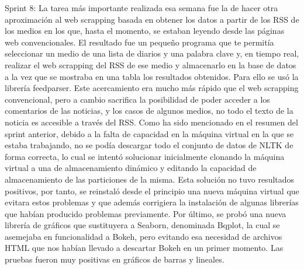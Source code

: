 Sprint 8:
La tarea más importante realizada esa semana fue la de hacer otra aproximación al web scrapping basada en obtener los datos a partir de los RSS de los medios en los que, hasta el momento, se estaban leyendo desde las páginas web convencionales. El resultado fue un pequeño programa que te permitía seleccionar un medio de una lista de diarios y una palabra clave y, en tiempo real, realizar el web scrapping del RSS de ese medio y almacenarlo en la base de datos a la vez que se mostraba en una tabla los resultados obtenidos. Para ello se usó la librería feedparser.
Este acercamiento era mucho más rápido que el web scrapping convencional, pero a cambio sacrifica la posibilidad de poder acceder a los comentarios de las noticias, y los casos de algunos medios, no todo el texto de la noticia es accesible a través del RSS.
Como ha sido mencionado en el resumen del sprint anterior, debido a la falta de capacidad en la máquina virtual en la que se estaba trabajando, no se podía descargar todo el conjunto de datos de NLTK de forma correcta, lo cual se intentó solucionar inicialmente clonando la máquina virtual a una de almacenamiento dinámico y editando la capacidad de almacenamiento de las particiones de la misma. 
Esta solución no tuvo resultados positivos, por tanto, se reinstaló desde el principio una nueva máquina virtual que evitara estos problemas y que además corrigiera la instalación de algunas librerías que habían producido problemas previamente.
Por último, se probó una nueva librería de gráficos que sustituyera a Seaborn, denominada Bqplot, la cual se asemejaba en funcionalidad a Bokeh, pero evitando esa necesidad de archivos HTML que nos habían llevado a descartar Bokeh en un primer momento. Las pruebas fueron muy positivas en gráficos de barras y lineales.

